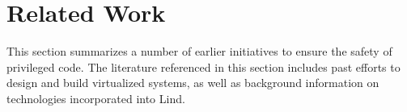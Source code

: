 \section{Related Work}
\label{sec.related_work}

This section summarizes a number of earlier initiatives to ensure the safety of privileged code. 
The literature referenced in this section includes past efforts to design and build virtualized systems, 
as well as background information on technologies incorporated into Lind.




